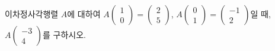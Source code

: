 \hspace*{2mm}\begin{minipage}[t]{\dimexpr\linewidth-2mm\relax}\vspace{0pt}
이차정사각행렬 $A$에 대하여 $A\begin{pmatrix} 1 \\ 0 \end{pmatrix}=\begin{pmatrix} 2 \\ 5 \end{pmatrix}$, $A\begin{pmatrix} 0 \\ 1 \end{pmatrix}=\begin{pmatrix} -1 \\ 2 \end{pmatrix}$일 때, $A\begin{pmatrix} -3 \\ 4 \end{pmatrix}$를 구하시오.\end{minipage}
